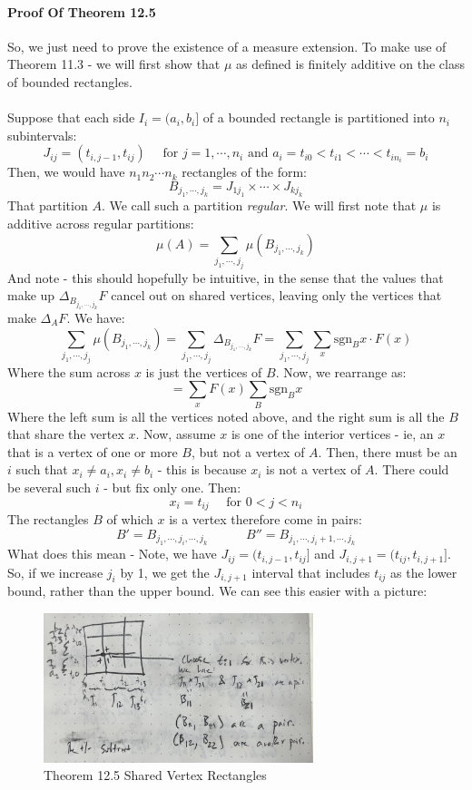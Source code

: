 \documentclass[12pt,a4paper]{article}
\newcommand{\1}[1]{\mathbbm{1}\left\{ #1 \right\}}
\newcommand{\sgn}{\text{sgn}}
\begin{document}
\paragraph{Proof Of Theorem 12.5} So, we just need to prove the existence of a measure extension. To make use of Theorem 11.3 - we will first show that $\mu$ as defined is finitely additive on the class of bounded rectangles.
\\\\
Suppose that each side $I_i = (a_i,b_i]$ of a bounded rectangle is partitioned into $n_i$ subintervals:
$$
	J_{ij} = (t_{i,j-1},t_{ij}) \quad\text{ for $j = 1,\cdots,n_i$ and $a_i = t_{i0} < t_{i1} < \cdots < t_{in_i} = b_i$}
$$
Then, we would have $n_1n_2\cdots n_k$ rectangles of the form:
$$
	B_{j_1,\cdots,j_k} = J_{1j_1} \times \cdots \times J_{kj_k}
$$
That partition $A$. We call such a partition \textit{regular}. We will first note that $\mu$ is additive across regular partitions:
$$
	\mu(A) = \sum_{j_1,\cdots,j_j} \mu(B_{j_1,\cdots,j_k})
$$
And note - this should hopefully be intuitive, in the sense that the values that make up $\Delta_{B_{j_1,\cdots,j_k}} F$ cancel out on shared vertices, leaving only the vertices that make $\Delta_A F$. We have:
$$
	\sum_{j_1,\cdots,j_j} \mu(B_{j_1,\cdots,j_k}) =
	\sum_{j_1,\cdots,j_j} \Delta_{B_{j_1,\cdots,j_k}} F =
	\sum_{j_1,\cdots,j_j} \sum_x \sgn_B x \cdot F(x)
$$
Where the sum across $x$ is just the vertices of $B$. Now, we rearrange as:
$$
	= \sum_x F(x) \sum_{B} \sgn_B x
$$
Where the left sum is all the vertices noted above, and the right sum is all the $B$ that share the vertex $x$. Now, assume $x$ is one of the interior vertices - ie, an $x$ that is a vertex of one or more $B$, but not a vertex of $A$. Then, there must be an $i$ such that $x_i \neq a_i, x_i \neq b_i$ - this is because $x_i$ is not a vertex of $A$. There could be several such $i$ - but fix only one. Then:
$$
	x_i = t_{ij} \quad\text{ for $0 < j < n_i$}
$$
The rectangles $B$ of which $x$ is a vertex therefore come in pairs:
$$
	B' = B_{j_1, \cdots, j_i, \cdots, j_k} \quad\quad\quad
	B'' = B_{j_1, \cdots, j_i + 1, \cdots, j_k}
$$
What does this mean - Note, we have $J_{ij} = (t_{i,j-1},t_{ij}]$ and $J_{i,j+1} = (t_{ij},t_{i,j+1}]$. So, if we increase $j_i$ by 1, we get the $J_{i,j+1}$ interval that includes $t_{ij}$ as the lower bound, rather than the upper bound. We can see this easier with a picture:
	\begin{figure}[H]
	\centering
	\includegraphics[width=0.7\textwidth]{shared_vertex_rectangles.jpg}
	\caption{Theorem 12.5 Shared Vertex Rectangles}
	\label{fig:example2}
\end{figure} 
\end{document}
